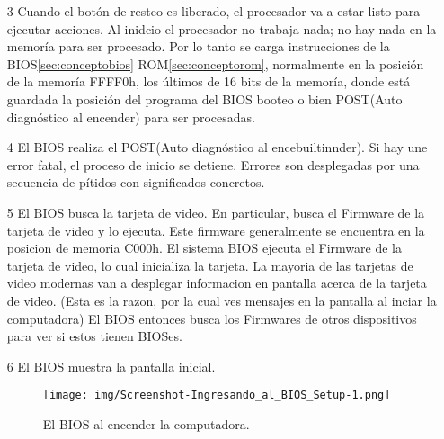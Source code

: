 \begin{enumerate}
		\item[3] Cuando el botón de resteo es liberado, el procesador va a
			estar listo para ejecutar acciones.  Al inidcio el procesador no
			trabaja nada; no hay nada en la memoría para ser procesado.  Por lo
			tanto se carga instrucciones de la BIOS\ref{sec:conceptobios}
			ROM\ref{sec:conceptorom}, normalmente en la posición de la memoría
			FFFF0h, los últimos de 16 bits de la memoría, donde está guardada
			la posición del programa del BIOS booteo o bien POST(Auto
			diagnóstico al encender) para ser procesadas.

	
		\item[4] El BIOS realiza el POST(Auto diagnóstico al encebuiltinnder). Si hay une
			error fatal, el proceso de inicio se detiene. Errores son desplegadas
			por una secuencia de pítidos con significados concretos.
	

		\item[5] El BIOS busca la tarjeta de video. En particular, busca el
			Firmware de la tarjeta de video y lo ejecuta. Este firmware
			generalmente se encuentra en la posicion de memoria C000h.  El
			sistema BIOS ejecuta el Firmware de la tarjeta de video, lo cual
			inicializa la tarjeta. La mayoria de las tarjetas de video modernas
			van a desplegar informacion en pantalla acerca de la tarjeta de
			video. (Esta es la razon, por la cual ves mensajes en la pantalla
			al inciar la computadora) El BIOS entonces busca los Firmwares de
			otros dispositivos para ver si estos tienen BIOSes.
				
		\item[6] El BIOS muestra la pantalla inicial.
			\begin{figure}[H]
				\centering
					\texttt{[image: img/Screenshot-Ingresando\_al\_BIOS\_Setup-1.png]}
				\caption{El BIOS al encender la computadora.}
			\end{figure}
	

\end{enumerate}
